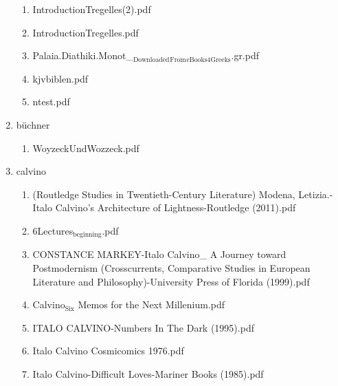 \documentclass[11pt]{article}
\begin{document}
\begin{enumerate}
\begin{enumerate}
\item IntroductionTregelles(2).pdf
\label{sec-1-1-1-1-28-11-2}

\item IntroductionTregelles.pdf
\label{sec-1-1-1-1-28-11-3}

\item Palaia.Diathiki.Monot\_$_{\text{Downloaded}}$$_{\text{From}}$$_{\text{eBooks4Greeks}}$.gr.pdf
\label{sec-1-1-1-1-28-11-4}

\item kjvbiblen.pdf
\label{sec-1-1-1-1-28-11-5}

\item ntest.pdf
\label{sec-1-1-1-1-28-11-6}
\end{enumerate}

\item büchner
\label{sec-1-1-1-1-28-12}
\begin{enumerate}
\item WoyzeckUndWozzeck.pdf
\label{sec-1-1-1-1-28-12-1}
\end{enumerate}

\item calvino
\label{sec-1-1-1-1-28-13}
\begin{enumerate}
\item (Routledge Studies in Twentieth-Century Literature) Modena, Letizia.-Italo Calvino's Architecture of Lightness-Routledge (2011).pdf
\label{sec-1-1-1-1-28-13-1}

\item 6Lectures$_{\text{beginning}}$.pdf
\label{sec-1-1-1-1-28-13-2}

\item CONSTANCE MARKEY-Italo Calvino\_ A Journey toward Postmodernism (Crosscurrents,  Comparative Studies in European Literature and Philosophy)-University Press of Florida (1999).pdf
\label{sec-1-1-1-1-28-13-3}

\item Calvino$_{\text{Six}}$ Memos for the Next Millenium.pdf
\label{sec-1-1-1-1-28-13-4}

\item ITALO CALVINO-Numbers In The Dark (1995).pdf
\label{sec-1-1-1-1-28-13-5}

\item Italo Calvino Cosmicomics  1976.pdf
\label{sec-1-1-1-1-28-13-6}

\item Italo Calvino-Difficult Loves-Mariner Books (1985).pdf
\label{sec-1-1-1-1-28-13-7}


\end{enumerate}
\end{enumerate}
\end{document}
